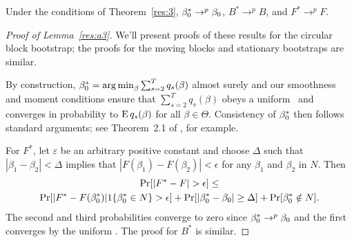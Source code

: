 \documentclass[12pt,fleqn]{article}
\begin{document}
\begin{lema}\label{res:a3}
  Under the conditions of Theorem~\ref{res:3}, $\beta_0^* \to^p
  \beta_0$, $B^* \to^p B$, and $F^* \to^p F$.
\end{lema}

\begin{proof}[Proof of Lemma~\ref{res:a3}]
  We'll present proofs of these results for the circular block
  bootstrap; the proofs for the moving blocks and stationary
  bootstraps are similar.

  By construction, $\beta_0^* = \operatorname*{arg\,min}_\beta \sum_{s=2}^T q_s(\beta)$
  almost surely and our smoothness and moment conditions ensure that
  $\sum_{s=2}^T q_s(\beta)$ obeys a uniform \lln\ and converges in
  probability to $\operatorname{E} q_s(\beta)$ for all $\beta \in \Theta$.
  Consistency of $\beta_0^*$ then follows standard arguments; see
  Theorem~2.1 of \cite{NeM:94}, for example.

  For $F^*$, let $\varepsilon$ be an arbitrary positive constant and
  choose $\Delta$ such that $|\beta_1 - \beta_2| < \Delta$ implies
  that $|F(\beta_1) - F(\beta_2) | < \epsilon$ for any $\beta_1$ and
  $\beta_2$ in $N$. Then
  \begin{multline*}
    \operatorname{Pr}[|F^* - F| > \epsilon] \leq \\
    \operatorname{Pr}[|F^* - F(\beta_0^*)| 1\{\beta_0^* \in N\} > \epsilon]
      + \operatorname{Pr}[\lvert \beta_0^* - \beta_0 \rvert \geq \Delta]
      + \operatorname{Pr}[\beta_0^* \notin N].
  \end{multline*}
  The second and third probabilities converge to zero since
  $\beta_0^* \to^p \beta_0$ and the first converges by the uniform
  \lln. The proof for $B^*$ is similar.
\end{proof}
\end{document}
